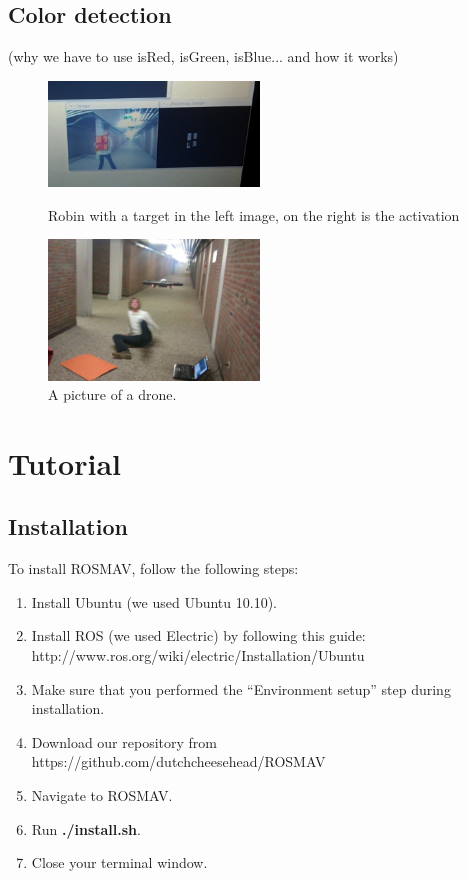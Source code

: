 \documentclass[a4paper,10pt]{article}
\begin{document}
\subsection{Color detection}
(why we have to use isRed, isGreen, isBlue... and how it works)
\begin{figure}[h!]
	\caption{Robin with a target in the left image, on the right is the activation}
	\centering
	\includegraphics[width=0.5\textwidth]{images/robinPresentActivation}
	\label{fig:robinPresentActivation}
\end{figure}

\begin{figure}[h!]
	\caption{A picture of a drone.}
	\centering
	\includegraphics[width=0.5\textwidth]{images/droneAttack}
\end{figure}

\section{Tutorial}
\subsection{Installation}
To install ROSMAV, follow the following steps:
\begin{enumerate}
\item Install Ubuntu (we used Ubuntu 10.10).

\item Install ROS (we used Electric) by following this guide: \\
      http://www.ros.org/wiki/electric/Installation/Ubuntu

\item Make sure that you performed the ``Environment setup'' step during installation.

\item Download our repository from
      https://github.com/dutchcheesehead/ROSMAV

\item Navigate to ROSMAV.

\item Run \textbf{./install.sh}.
\item Close your terminal window.
\end{enumerate}
\end{document}
